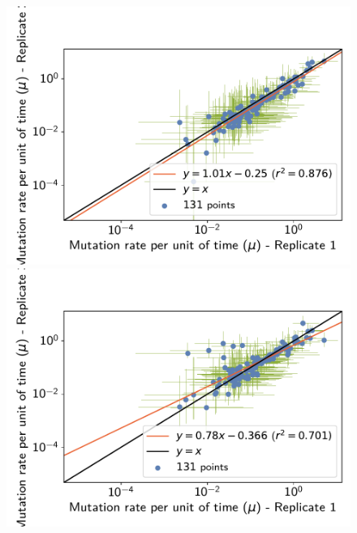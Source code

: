 \documentclass{article}
\begin{document}
	\begin{figure}[H]
		\centering
		\begin{minipage}{0.32\linewidth}
			\includegraphics[width=\linewidth, page=1]{isopods/12CDS_SiteMutSelBranchNe_Rep-1-2_LogMutationRatePerTime}
		\end{minipage} \hfill
		\begin{minipage}{0.32\linewidth}
			\includegraphics[width=\linewidth, page=1]{isopods/12CDS_SiteMutSelBranchNe_Rep-1-3_LogMutationRatePerTime}
		\end{minipage} \hfill
		\begin{minipage}{0.32\linewidth}

\end{minipage}
\end{figure}
\end{document}
